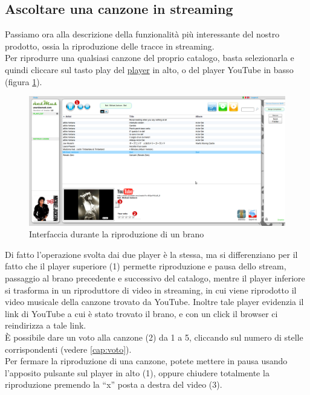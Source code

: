 \subsection{Ascoltare una canzone in streaming}

Passiamo ora alla descrizione della funzionalit\`a pi\`u
interessante del nostro prodotto, ossia la riproduzione delle tracce in streaming.\\
Per riprodurre una qualsiasi canzone del proprio catalogo, basta selezionarla e
quindi cliccare sul tasto play del \underline{player} in alto, o del player
YouTube in basso (figura \ref{fig:play}).\\ 
\begin{figure}[!htbp]
  \centering
  \includegraphics[width=14cm]{img/MU/player_youtube.png}
\caption{Interfaccia durante la riproduzione di un brano}
\label{fig:play}
\end{figure} 

Di fatto l'operazione svolta dai due player \`e la stessa, ma
si differenziano per il fatto che il player superiore (1) permette riproduzione
e pausa dello stream, passaggio al brano precedente e successivo del catalogo, mentre il player
inferiore si trasforma in un riproduttore di video in streaming, in cui viene
riprodotto il video musicale della canzone trovato da YouTube.
Inoltre tale player evidenzia il link di YouTube a cui \`e stato trovato il
brano, e con un click il browser ci reindirizza a tale link.\\
\`E possibile dare un voto alla canzone (2) da 1 a 5, cliccando sul numero di
stelle corrispondenti (vedere \ref{cap:voto}).\\

Per fermare la riproduzione di una canzone, potete mettere in pausa usando
l'apposito pulsante sul player in alto (1), oppure chiudere totalmente la
riproduzione premendo la ``x'' posta a destra del video (3).\\

